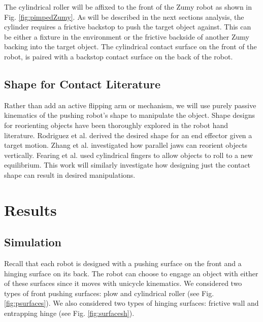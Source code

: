 \documentclass[runningheads,a4paper]{llncs}
\begin{document}
The cylindrical roller will be affixed to the front of the Zumy robot as shown in Fig. \ref{fig:pimpedZumy}.
As will be described in the next sections analysis, the cylinder requires a frictive backstop to push the target object against.
This can be either a fixture in the environment or the frictive backside of another Zumy backing into the target object.
The cylindrical contact surface on the front of the robot, is paired with a backstop contact surface on the back of the robot.

\subsection{Shape for Contact Literature}
Rather than add an active flipping arm or mechanism, we will use purely passive kinematics of the pushing robot's shape to manipulate the object.
Shape designs for reorienting objects have been thoroughly explored in the robot hand literature.
Rodriguez et al.\cite{rodriguez2013effector} derived the desired shape for an end effector given a target motion.
Zhang et al.\cite{zhang2002gripper} investigated how parallel jaws can reorient objects vertically.
Fearing et al. \cite{fearing1986simplified} used cylindrical fingers to allow objects to roll to a new equilibrium.
This work will similarly investigate how designing just the contact shape can result in desired manipulations.

\clearpage
\section{Results}
\subsection{Simulation}
Recall that each robot is designed with a pushing surface on the front and a hinging surface on its back.
The robot can choose to engage an object with either of these surfaces since it moves with unicycle kinematics.
We considered two types of front pushing surfaces: plow and cylindrical roller (see Fig. \ref{fig:psurfaces}).
We also considered two types of hinging surfaces: frictive wall and entrapping hinge (see Fig. \ref{fig:surfacesh}).
\end{document}
